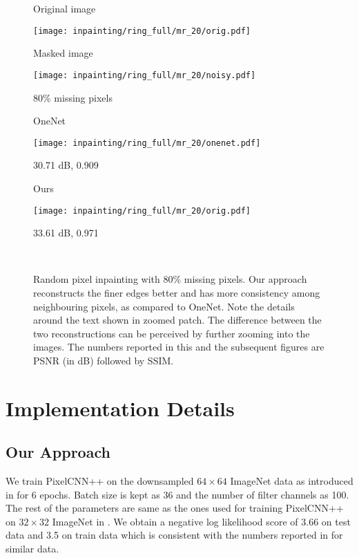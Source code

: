 \documentclass[journal,twoside]{IEEEtran}
\begin{document}
\begin{figure*}[t] 
    \centering
\begin{minipage}{\textwidth}
\centering
\begin{minipage}{.24\textwidth}
\centerline{Original image}
\vspace{0.01cm}
\texttt{[image: inpainting/ring\_full/mr\_20/orig.pdf]}  
\centerline{}
\end{minipage}
\begin{minipage}{.24\textwidth}
\centerline{Masked image}
\vspace{0.1cm}
\texttt{[image: inpainting/ring\_full/mr\_20/noisy.pdf]}  
  
\centerline{ 80\% missing pixels}
\end{minipage}
\begin{minipage}{.24\textwidth}
\centerline{OneNet}
\vspace{0.1cm}
\texttt{[image: inpainting/ring\_full/mr\_20/onenet.pdf]}  

\centerline{ 30.71 dB, 0.909}
\end{minipage}
\begin{minipage}{.24\textwidth}
\centerline{Ours}
\vspace{0.1cm}
\texttt{[image: inpainting/ring\_full/mr\_20/orig.pdf]}  
\centerline{ 33.61 dB, 0.971}

\end{minipage}\\

\end{minipage}
    \caption{Random pixel inpainting with 80\% missing pixels. Our approach reconstructs the finer edges better and has more consistency among neighbouring pixels, as compared to OneNet. Note the details around the text shown in zoomed patch. The difference between the two reconstructions can be perceived by further zooming into the images. The numbers reported in this and the subsequent figures are PSNR (in dB) followed by SSIM. }
    \label{fig:inpainting}
\end{figure*}



\section{Implementation Details}

\subsection{Our Approach}
\label{sec:our_implementation}
We train PixelCNN++ on the downsampled $64\times64$ ImageNet data as introduced in \cite{van2016pixel} for 6 epochs. Batch size is kept as 36 and the number of filter channels as 100. The rest of the parameters are same as the ones used for training PixelCNN++ on $32\times32$ ImageNet in \cite{salimans2017pixelcnn++}. We obtain a negative log likelihood score of 3.66 on test data and 3.5 on train data which is consistent with the numbers reported in \cite{salimans2017pixelcnn++} for similar data. 
\end{document}
